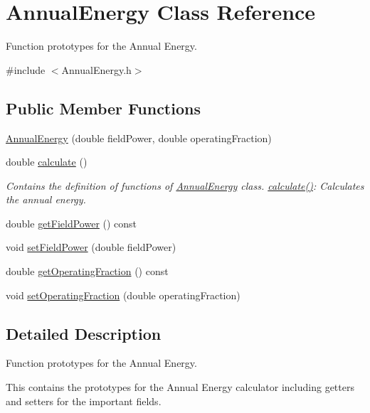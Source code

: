 \hypertarget{class_annual_energy}{}\section{Annual\+Energy Class Reference}
\label{class_annual_energy}


Function prototypes for the Annual Energy.  




{\ttfamily \#include $<$Annual\+Energy.\+h$>$}

\subsection*{Public Member Functions}
\begin{DoxyCompactItemize}
\item 
\hyperlink{class_annual_energy_a5e446ce85879bafeac8fc992cb5b9ed7}{Annual\+Energy} (double field\+Power, double operating\+Fraction)
\item 
double \hyperlink{class_annual_energy_ab599860ffb32ce20a1042a3e9d2ad57f}{calculate} ()
\begin{DoxyCompactList}\small\item\em Contains the definition of functions of \hyperlink{class_annual_energy}{Annual\+Energy} class. \hyperlink{class_annual_energy_ab599860ffb32ce20a1042a3e9d2ad57f}{calculate()}\+: Calculates the annual energy. \end{DoxyCompactList}\item 
double \hyperlink{class_annual_energy_a52aa52274243f578ea7f92d27707cacb}{get\+Field\+Power} () const
\item 
void \hyperlink{class_annual_energy_a4f7212fcf2f6fcd2b12f36ca26a368a1}{set\+Field\+Power} (double field\+Power)
\item 
double \hyperlink{class_annual_energy_a51c2bd68a5268ec9bafe3c70b3a7a6ad}{get\+Operating\+Fraction} () const
\item 
void \hyperlink{class_annual_energy_a5c127c7d5e2a5e4f50559f8b546e8998}{set\+Operating\+Fraction} (double operating\+Fraction)
\end{DoxyCompactItemize}


\subsection{Detailed Description}
Function prototypes for the Annual Energy. 

This contains the prototypes for the Annual Energy calculator including getters and setters for the important fields.

